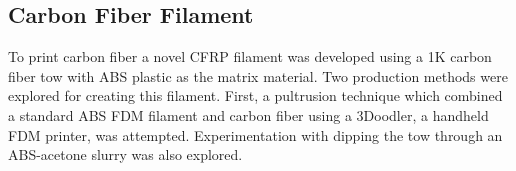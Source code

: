 
\hfill \vspace{-20pt}

\subsection*{Carbon Fiber Filament}

To print carbon fiber a novel CFRP filament was developed using a 1K carbon fiber tow with ABS plastic as the matrix material. Two production methods were explored for creating this filament. First, a pultrusion technique which combined a standard ABS FDM filament and carbon fiber using a 3Doodler, a handheld FDM printer, was attempted. Experimentation with dipping the tow through an ABS-acetone slurry was also explored.

